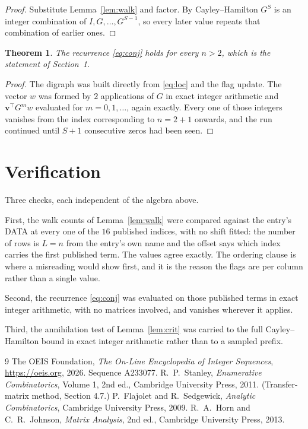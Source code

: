 \documentclass[11pt,a4paper]{article}
\theoremstyle{plain}
\newtheorem{theorem}{Theorem}
\theoremstyle{definition}
\begin{document}
\begin{proof}
Substitute Lemma~\ref{lem:walk} and factor. By Cayley--Hamilton $G^{S}$ is an integer
combination of $I,G,\dots,G^{S-1}$, so every later value repeats that combination of earlier
ones.
\end{proof}

\begin{theorem}
The recurrence \eqref{eq:conj} holds for every $n>2$, which is the statement of
Section~1.
\end{theorem}

\begin{proof}
The digraph was built directly from \eqref{eq:loc} and the flag update. The vector $w$ was
formed by $2$ applications of $G$ in exact integer arithmetic and
$\mathbf{v}^{\!\top}G^{m}w$ evaluated for $m=0,1,\dots$, again exactly. Every one of
those integers vanishes from the index corresponding to $n=2+1$ onwards, and the run
continued until $S+1$ consecutive zeros had been seen.
\end{proof}

\section{Verification}

Three checks, each independent of the algebra above.

First, the walk counts of Lemma~\ref{lem:walk} were compared against the entry's DATA at
every one of the $16$ published indices, with no shift fitted: the number of rows is
$L=n$ from the entry's own name and the offset says which index carries the first
published term. The values agree exactly. The ordering clause is where a misreading would
show first, and it is the reason the flags are per column rather than a single value.

Second, the recurrence \eqref{eq:conj} was evaluated on those published terms in exact
integer arithmetic, with no matrices involved, and vanishes wherever it applies.

Third, the annihilation test of Lemma~\ref{lem:crit} was carried to the full
Cayley--Hamilton bound in exact integer arithmetic rather than to a sampled prefix.

\begin{thebibliography}{9}
 The OEIS Foundation, \emph{The On-Line Encyclopedia of Integer
Sequences}, \url{https://oeis.org}, 2026. Sequence A233077.
 R.~P.~Stanley, \emph{Enumerative Combinatorics}, Volume 1, 2nd ed.,
Cambridge University Press, 2011. (Transfer-matrix method, Section 4.7.)
 P.~Flajolet and R.~Sedgewick, \emph{Analytic Combinatorics}, Cambridge
University Press, 2009.
 R.~A.~Horn and C.~R.~Johnson, \emph{Matrix Analysis}, 2nd ed., Cambridge
University Press, 2013.
\end{thebibliography}
\end{document}
